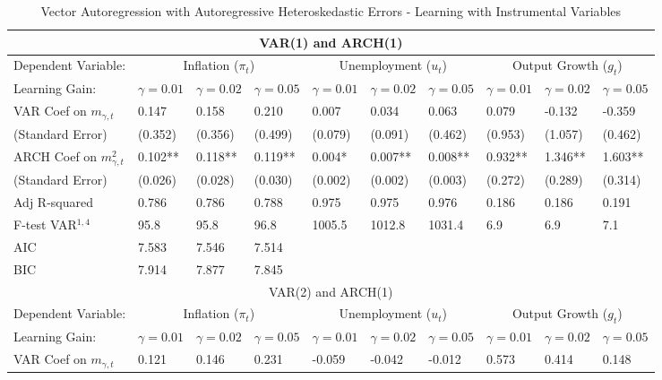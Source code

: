 \documentclass[12pt]{article}
\begin{document}
\begin{table}\caption{Vector Autoregression with Autoregressive Heteroskedastic Errors - Learning with Instrumental Variables}\label{tb:variv}
\begin{small}\begin{center}
\begin{tabular}{l|p{0.64in} p{0.64in} p{0.64in}|p{0.64in} p{0.64in} p{0.64in}|p{0.64in} p{0.64in} p{0.64in}}\hline
\multicolumn{10}{c}{VAR(1) and ARCH(1)} \\ \hline \hline
Dependent Variable:  & \multicolumn{3}{c|}{Inflation ($\pi_t$)} & \multicolumn{3}{c|}{Unemployment ($u_t$)} &  \multicolumn{3}{c}{Output Growth ($g_t$)} \\ \hline
Learning Gain: & $\gamma=0.01$ & $\gamma=0.02$ & $\gamma=0.05$ & $\gamma=0.01$ & $\gamma=0.02$ & $\gamma=0.05$& $\gamma=0.01$ & $\gamma=0.02$ & $\gamma=0.05$ \\ \hline
VAR Coef on $m_{\gamma,t}$ & 0.147 & 0.158 & 0.210 & 0.007 & 0.034 & 0.063 & 0.079 & -0.132 & -0.359 \\
(Standard Error) & (0.352) & (0.356) & (0.499) & (0.079) & (0.091) & (0.462) & (0.953) & (1.057) & (0.462) \\ \hline
ARCH Coef on $m_{\gamma,t}^2$ & 0.102** & 0.118** & 0.119** & 0.004* & 0.007** & 0.008** & 0.932** & 1.346** & 1.603** \\
(Standard Error) & (0.026) & (0.028) & (0.030) & (0.002) & (0.002) & (0.003) & (0.272) & (0.289) & (0.314) \\ \hline
Adj R-squared & 0.786 & 0.786 & 0.788 & 0.975 & 0.975 & 0.976 & 0.186 & 0.186 & 0.191 \\ 
F-test VAR$^{1,4}$ & 95.8 & 95.8 & 96.8 & 1005.5 & 1012.8 & 1031.4 & 6.9 & 6.9 & 7.1 \\ 
AIC & 7.583 & 7.546 & 7.514   & & &   & & & \\ 
BIC & 7.914 & 7.877 & 7.845   & & &   & & & \\ \hline \hline
\multicolumn{10}{c}{VAR(2) and ARCH(1)} \\ \hline \hline
Dependent Variable:  & \multicolumn{3}{c|}{Inflation ($\pi_t$)} & \multicolumn{3}{c|}{Unemployment ($u_t$)} &  \multicolumn{3}{c}{Output Growth ($g_t$)} \\ \hline
Learning Gain: & $\gamma=0.01$ & $\gamma=0.02$ & $\gamma=0.05$ & $\gamma=0.01$ & $\gamma=0.02$ & $\gamma=0.05$& $\gamma=0.01$ & $\gamma=0.02$ & $\gamma=0.05$ \\ \hline
VAR Coef on $m_{\gamma,t}$ & 0.121 & 0.146 & 0.231 & -0.059 & -0.042 & -0.012 & 0.573 & 0.414 & 0.148 \\

\end{tabular}
\end{center}
\end{small}
\end{table}
\end{document}
